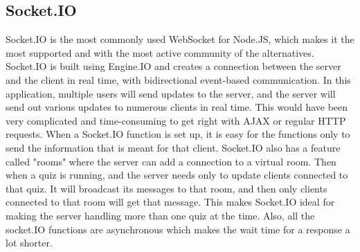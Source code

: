 \subsection{Socket.IO}
Socket.IO\cite{socketio} is the most commonly used WebSocket\cite{websocket} for Node.JS, which makes it the most supported and with the most active community of the alternatives. Socket.IO is built using Engine.IO\cite{EngineIO:Info} and creates a connection between the server and the client in real time, with bidirectional event-based communication. In this application, multiple users will send updates to the server, and the server will send out various updates to numerous clients in real time. This would have been very complicated and time-consuming to get right with AJAX or regular HTTP requests. When a Socket.IO function is set up, it is easy for the functions only to send the information that is meant for that client. Socket.IO also has a feature called "rooms" where the server can add a connection to a virtual room. Then when a quiz is running, and the server needs only to update clients connected to that quiz. It will broadcast its messages to that room, and then only clients connected to that room will get that message. This makes Socket.IO ideal for making the server handling more than one quiz at the time. Also, all the socket.IO functions are asynchronous which makes the wait time for a response a lot shorter.